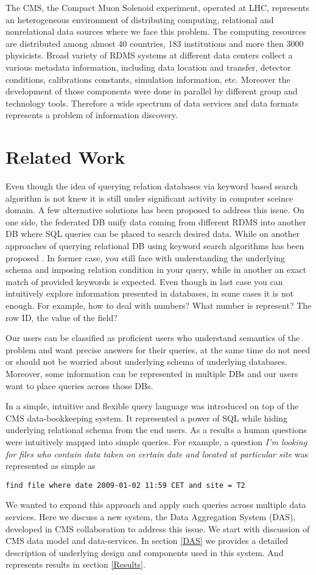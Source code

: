 \documentclass[a4paper]{jpconf}
\begin{document}
The CMS, the Compact Muon Solenoid experiment, operated at LHC,
represents an heterogeneous environment of distributing computing, relational and
nonrelational data sources where we face this problem. The computing resources
are distributed among almost 40 countries, 183 institutions and more then 3000 physicists.
Broad variety of RDMS systems at different data centers collect a various
metadata information, including data location and transfer, detector conditions,
calibrations constants, simulation information, etc. Moreover the development
of those components were done in parallel by different group and technology
tools. Therefore a wide spectrum of data services and
data formats represents a problem of information discovery.

\section{Related Work}
Even though the idea of querying relation databases via keyword based search
algorithm is not knew it is still under significant activity in computer
sceince domain. A few
alternative solutions has been proposed to address this issue. On one
side, the federated DB \cite{FedDB} unify data coming from different
RDMS into another DB where SQL queries can be placed to search desired
data. While on another approaches of querying relational
DB using keyword search algorithms has been proposed \cite{DBXplorer, QueryAnswer}.
In former case, you still face with understanding the underlying schema and
imposing relation condition in your query, while in another an exact match
of provided keywords is expected. Even though in last case you can 
intuitively explore information presented in databases, in some cases
it is not enough. For example, how to deal with numbers? What number is represent?
The row ID, the value of the field?


Our users can be classified as proficient
users who understand semantics of the problem and want precise answers
for their queries, at the same time do not need or should not be worried
about underlying schema of underlying databases. Moreover, some information
can be represented in multiple DBs and our users want to place 
queries across those DBs.

In \cite{DBS-QL} a simple, intuitive and flexible query language was introduced 
on top of the CMS data-bookkeeping system. It represented a power of SQL while
hiding underlying relational schema from the end users. As a results
a human questions were intuitively mapped into simple queries. For example,
a question
{\it I'm looking for files who contain data taken on certain date and located at
particular site} was represented as simple as
\begin{verbatim}
find file where date 2009-01-02 11:59 CET and site = T2
\end{verbatim}
We wanted to expand this approach and apply such queries across multiple
data services. Here we discuss a new system, the Data Aggregation System (DAS),
developed in CMS collaboration to address this issue. We start with
discussion of CMS data model and data-services. In section \ref{DAS}
we provides a detailed description of underlying design and components
used in this system. And represents results in section \ref{Results}.
\end{document}
